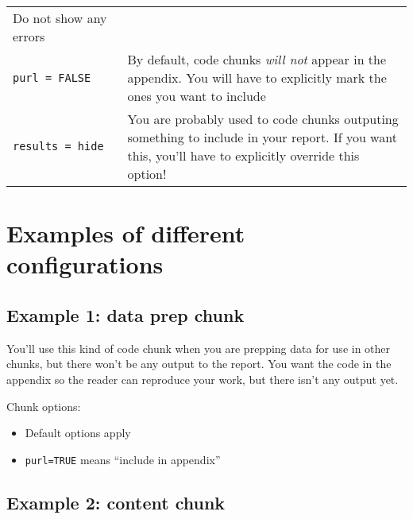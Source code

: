 \documentclass[
]{article}
\providecommand{\tightlist}{%
  \setlength{\itemsep}{0pt}\setlength{\parskip}{0pt}}
\begin{document}
\begin{longtable}[]{@{}ll@{}}
\begin{minipage}[t]{0.70\columnwidth}
Do not show any errors\strut
\end{minipage}\tabularnewline
\begin{minipage}[t]{0.24\columnwidth}\raggedright
\texttt{purl\ =\ FALSE}\strut
\end{minipage} & \begin{minipage}[t]{0.70\columnwidth}\raggedright
By default, code chunks \emph{will not} appear in the appendix. You will
have to explicitly mark the ones you want to include\strut
\end{minipage}\tabularnewline
\begin{minipage}[t]{0.24\columnwidth}\raggedright
\texttt{results\ =\ \textquotesingle{}hide\textquotesingle{}}\strut
\end{minipage} & \begin{minipage}[t]{0.70\columnwidth}\raggedright
You are probably used to code chunks outputing something to include in
your report. If you want this, you'll have to explicitly override this
option!\strut
\end{minipage}\tabularnewline
\bottomrule
\end{longtable}

\hypertarget{examples-of-different-configurations}{%
\section{Examples of different
configurations}\label{examples-of-different-configurations}}

\hypertarget{example-1-data-prep-chunk}{%
\subsection{Example 1: data prep
chunk}\label{example-1-data-prep-chunk}}

You'll use this kind of code chunk when you are prepping data for use in
other chunks, but there won't be any output to the report. You want the
code in the appendix so the reader can reproduce your work, but there
isn't any output yet.

Chunk options:

\begin{itemize}
\tightlist
\item
  Default options apply
\item
  \texttt{purl=TRUE} means ``include in appendix''
\end{itemize}

\hypertarget{example-2-content-chunk}{%
\subsection{Example 2: content chunk}\label{example-2-content-chunk}}
\end{document}
